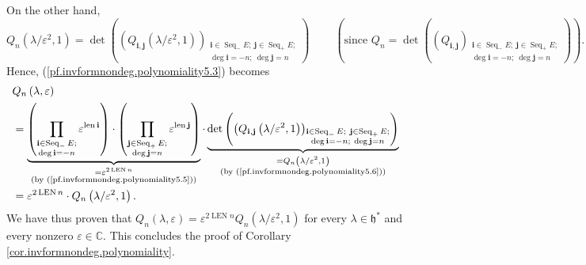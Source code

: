 \documentclass
[numbers=enddot,12pt,final,onecolumn,german,notitlepage]{scrartcl}%
\theoremstyle{definition}
\begin{document}
On the other hand,%
\begin{equation}
Q_{n}\left(  \lambda/\varepsilon^{2},1\right)  =\det\left(  \left(
Q_{\mathbf{i},\mathbf{j}}\left(  \lambda/\varepsilon^{2},1\right)  \right)
_{\substack{\mathbf{i}\in\operatorname*{Seq}\nolimits_{-}E;\ \mathbf{j}%
\in\operatorname*{Seq}\nolimits_{+}E;\\\deg\mathbf{i}=-n;\ \deg\mathbf{j}%
=n}}\right)  \ \ \ \ \ \ \ \ \ \ \left(  \text{since }Q_{n}=\det\left(
\left(  Q_{\mathbf{i},\mathbf{j}}\right)  _{\substack{\mathbf{i}%
\in\operatorname*{Seq}\nolimits_{-}E;\ \mathbf{j}\in\operatorname*{Seq}%
\nolimits_{+}E;\\\deg\mathbf{i}=-n;\ \deg\mathbf{j}=n}}\right)  \right)  .
\label{pf.invformnondeg.polynomiality5.5}%
\end{equation}
Hence, (\ref{pf.invformnondeg.polynomiality5.3}) becomes%
\begin{align*}
&  Q_{n}\left(  \lambda,\varepsilon\right) \\
&  =\underbrace{\left(  \prod\limits_{\substack{\mathbf{i}\in
\operatorname*{Seq}\nolimits_{-}E;\\\deg\mathbf{i}=-n}}\varepsilon
^{\operatorname*{len}\mathbf{i}}\right)  \cdot\left(  \prod
\limits_{\substack{\mathbf{j}\in\operatorname*{Seq}\nolimits_{+}%
E;\\\deg\mathbf{j}=n}}\varepsilon^{\operatorname*{len}\mathbf{j}}\right)
}_{\substack{=\varepsilon^{2\operatorname*{LEN}n}\\\text{(by
(\ref{pf.invformnondeg.polynomiality5.5}))}}}\cdot\underbrace{\det\left(
\left(  Q_{\mathbf{i},\mathbf{j}}\left(  \lambda/\varepsilon^{2},1\right)
\right)  _{\substack{\mathbf{i}\in\operatorname*{Seq}\nolimits_{-}%
E;\ \mathbf{j}\in\operatorname*{Seq}\nolimits_{+}E;\\\deg\mathbf{i}%
=-n;\ \deg\mathbf{j}=n}}\right)  }_{\substack{=Q_{n}\left(  \lambda
/\varepsilon^{2},1\right)  \\\text{(by
(\ref{pf.invformnondeg.polynomiality5.6}))}}}\\
&  =\varepsilon^{2\operatorname*{LEN}n}\cdot Q_{n}\left(  \lambda
/\varepsilon^{2},1\right)  .
\end{align*}
We have thus proven that $Q_{n}\left(  \lambda,\varepsilon\right)
=\varepsilon^{2\operatorname*{LEN}n}Q_{n}\left(  \lambda/\varepsilon
^{2},1\right)  $ for every $\lambda\in\mathfrak{h}^{\ast}$ and every nonzero
$\varepsilon\in\mathbb{C}$. This concludes the proof of Corollary
\ref{cor.invformnondeg.polynomiality}.
\end{document}
